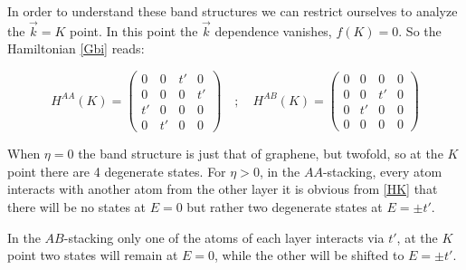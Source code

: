 In order to understand these band structures we can restrict ourselves to analyze the $\vec{k}=K$ point. In this point the $\vec{k}$ dependence vanishes, $f(K)=0$. So the Hamiltonian \eqref{Gbi} reads:

\begin{equation}
   H^{AA}(K) = \left(\begin{array}{cc|cc}
         0 & 0 & t' & 0 \\
         0 & 0 & 0 & t' \\\hline
         t' & 0 & 0 & 0 \\
         0 & t' & 0 & 0
   \end{array}\right)\quad;\quad
   H^{AB}(K) = \left(\begin{array}{c|cc|c}
         0 & 0 & 0 & 0 \\ \hline
         0 & 0 & t' & 0 \\
         0 & t' & 0 & 0 \\ \hline
         0 & 0 & 0 & 0
   \end{array}\right)
\label{HK}
\end{equation}

When $\eta=0$ the band structure is just that of graphene, but twofold, so at the $K$ point there are 4 degenerate states.
For $\eta>0$, in the $AA$-stacking, every atom interacts with another atom from the other layer it is obvious from \eqref{HK} that there will be no states at $E=0$ but rather two degenerate states at $E=\pm t'$.

In the $AB$-stacking only one of the atoms of each layer interacts via $t'$, at the $K$ point two states will remain at $E=0$, while the other will be shifted to $E=\pm t'$.

